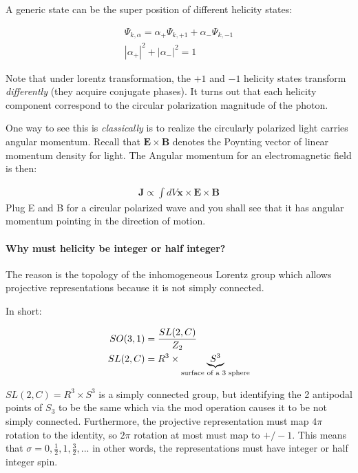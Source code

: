 \documentclass[12pt]{scrartcl}
\begin{document}
A generic state can be the super position of different helicity states:

\begin{align}
\Psi_{k, \alpha} = \alpha_+ \Psi_{k, +1} + \alpha_- \Psi_{k, -1} \\
|\alpha_+|^2 + |\alpha_-|^2 = 1
\end{align}

Note that under lorentz transformation, the $+1$ and $-1$ helicity states transform \emph{differently} (they acquire conjugate phases).  It turns out that each helicity component correspond to the circular polarization magnitude of the photon.  

One way to see this is \emph{classically} is to realize the circularly polarized light carries angular momentum.  Recall that $\mathbf{E} \times \mathbf{B}$ denotes the Poynting vector of linear momentum density for light.  The Angular momentum for an electromagnetic field is then:

\begin{align}
\mathbf{J} \propto \int dV \mathbf{x} \times \mathbf{E} \times \mathbf{B}
\end{align}
Plug E and B for a circular polarized wave and you shall see that it has angular momentum pointing in the direction of motion.

\paragraph{Why must helicity be integer or half integer?}
The reason is the topology of the inhomogeneous Lorentz group which allows projective representations because it is not simply connected.

In short: 

\begin{align}
SO(3, 1 ) & = {SL(2, C) \over Z_2} \\
SL(2, C)  &= R^3 \times \underbrace{S^3}_{\text{surface of a 3 sphere}}
\end{align}

$SL(2, C) = R^3 \times S^3$  is a simply connected group, but identifying the 2 antipodal points of $S_3$ to be the same which via the mod operation causes it to be not simply connected.  Furthermore, the projective representation must map $4 \pi$ rotation to the identity, so $2 \pi$ rotation at most must map to $+/- 1$.  This means that $\sigma = 0, \frac12, 1, \frac32, ...$ in other words, the representations must have integer or half integer spin.
\end{document}
